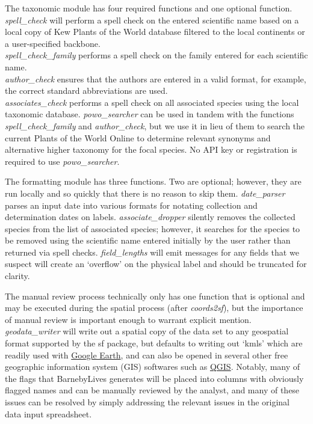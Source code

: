 \documentclass[
]{article}
\begin{document}
The taxonomic module has four required functions and one optional
function.\\
\emph{spell\_check} will perform a spell check on the entered scientific
name based on a local copy of Kew Plants of the World database filtered
to the local continents or a user-specified backbone.\\
\emph{spell\_check\_family} performs a spell check on the family entered
for each scientific name.\\
\emph{author\_check} ensures that the authors are entered in a valid
format, for example, the correct standard abbreviations are used.\\
\emph{associates\_check} performs a spell check on all associated
species using the local taxonomic database. \emph{powo\_searcher} can be
used in tandem with the functions \emph{spell\_check\_family} and
\emph{author\_check}, but we use it in lieu of them to search the
current Plants of the World Online to determine relevant synonyms and
alternative higher taxonomy for the focal species. No API key or
registration is required to use \emph{powo\_searcher}.

The formatting module has three functions. Two are optional; however,
they are run locally and so quickly that there is no reason to skip
them. \emph{date\_parser} parses an input date into various formats for
notating collection and determination dates on labels.
\emph{associate\_dropper} silently removes the collected species from
the list of associated species; however, it searches for the species to
be removed using the scientific name entered initially by the user
rather than returned via spell checks. \emph{field\_lengths} will emit
messages for any fields that we suspect will create an `overflow' on the
physical label and should be truncated for clarity.

The manual review process technically only has one function that is
optional and may be executed during the spatial process (after
\emph{coords2sf}), but the importance of manual review is important
enough to warrant explicit mention.\\
\emph{geodata\_writer} will write out a spatial copy of the data set to
any geospatial format supported by the sf package, but defaults to
writing out `kmls' which are readily used with
\href{https://earth.google.com/web/}{Google Earth}, and can also be
opened in several other free geographic information system (GIS)
softwares such as \href{https://www.qgis.org/}{QGIS}. Notably, many of
the flags that BarnebyLives generates will be placed into columns with
obviously flagged names and can be manually reviewed by the analyst, and
many of these issues can be resolved by simply addressing the relevant
issues in the original data input spreadsheet.
\end{document}
